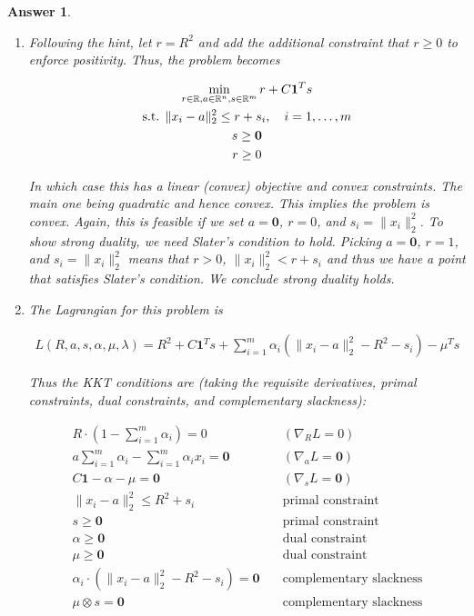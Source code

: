 \documentclass[12pt]{article}
\theoremstyle{colon}
\newtheorem*{answer}{Answer}
\begin{document}
\begin{answer}
  \

  \begin{enumerate}[label=\alph*)]
    \item Following the hint, let $r = R^2$ and add the additional constraint that $r \geq 0$ to enforce positivity. Thus, the problem becomes

      \begin{gather*}
        \min_{r \in \mathbb{R}, a \in \mathbb{R}^n, s \in \mathbb{R}^m} r + C \bm{1}^T s \\
        \text{s.t. } \lVert x_i - a \rVert_2^2 \leq r + s_i, \quad i = 1, \mathellipsis, m \\
        s \geq \bm{0} \\
        r \geq 0
      \end{gather*}

      In which case this has a linear (convex) objective and convex constraints. The main one being quadratic and hence convex. This implies the problem is convex. Again, this is feasible if we set $a = \bm{0}$, $r = 0$, and $s_i = \lVert x_i \rVert_2^2$. To show strong duality, we need Slater's condition to hold. Picking $a = \bm{0}$, $r = 1$, and $s_i = \lVert x_i \rVert_2^2$ means that $r > 0$, $\lVert x_i \rVert_2^2 < r + s_i$ and thus we have a point that satisfies Slater's condition. We conclude strong duality holds.

    \item The Lagrangian for this problem is

      \begin{gather*}
        L(R, a, s, \alpha, \mu, \lambda) = R^2 + C \bm{1}^T s + \sum_{i=1}^m \alpha_i (\lVert x_i - a \rVert_2^2 - R^2 - s_i) - \mu^T s
      \end{gather*}

      Thus the KKT conditions are (taking the requisite derivatives, primal constraints, dual constraints, and complementary slackness):

      \begin{align*}
        R \cdot (1 - \sum_{i=1}^m \alpha_i) = 0& \quad (\nabla_R L = 0) \\
        a \sum_{i=1}^m \alpha_i - \sum_{i=1}^m \alpha_i x_i = \bm{0}& \quad (\nabla_a L = \bm{0})\\
        C \bm{1} - \alpha - \mu = \bm{0}& \quad (\nabla_s L = \bm{0})\\
        \lVert x_i - a \rVert_2^2 \leq R^2 + s_i& \quad \text{primal constraint} \\
        s \geq \bm{0}& \quad \text{primal constraint} \\
        \alpha \geq \bm{0}& \quad \text{dual constraint} \\
        \mu \geq \bm{0}& \quad \text{dual constraint} \\
        \alpha_i \cdot (\lVert x_i - a \rVert_2^2 - R^2 - s_i)= \bm{0}& \quad \text{complementary slackness} \\
        \mu \otimes s = \bm{0}& \quad \text{complementary slackness} \\
      \end{align*}


\end{enumerate}
\end{answer}
\end{document}
